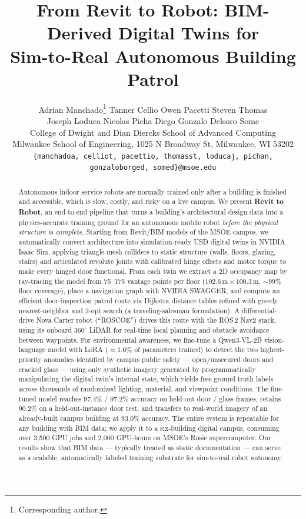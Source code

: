 \documentclass[10pt,twocolumn,letterpaper]{article}
\title{From Revit to Robot: BIM-Derived Digital Twins for\\
Sim-to-Real Autonomous Building Patrol}
\author{%
Adrian Manchado\thanks{Corresponding author.} \quad Tanner Cellio \quad Owen Pacetti \quad Steven Thomas\\
Joseph Loduca \quad Nicolas Picha \quad Diego Gonzalo \quad Delsoro Some\\
College of Dwight and Dian Diercks School of Advanced Computing\\
Milwaukee School of Engineering, 1025 N Broadway St, Milwaukee, WI 53202\\
{\tt\small \{manchadoa, celliot, pacettio, thomasst, loducaj, pichan, gonzaloborged, somed\}@msoe.edu}
}
\begin{document}
\maketitle

\begin{abstract}
Autonomous indoor service robots are normally trained only after a building is
finished and accessible, which is slow, costly, and risky on a live campus. We
present \textbf{Revit to Robot}, an end-to-end pipeline that turns a building's
architectural design data into a physics-accurate training ground for an
autonomous mobile robot \emph{before the physical structure is complete}.
Starting from Revit/BIM models of the MSOE campus, we automatically convert
architecture into simulation-ready USD digital twins in NVIDIA Isaac Sim,
applying triangle-mesh colliders to static structure (walls, floors, glazing,
stairs) and articulated revolute joints with calibrated hinge offsets and motor
torque to make every hinged door functional. From each twin we extract a 2D
occupancy map by ray-tracing the model from 75--175 vantage points per floor
($102.6\,\text{m}\times100.3\,\text{m}$, ${\sim}99\%$ floor coverage), place a
navigation graph with NVIDIA SWAGGER, and compute an efficient door-inspection patrol route
via Dijkstra distance tables refined with greedy nearest-neighbor and 2-opt
search (a traveling-salesman formulation). A differential-drive Nova Carter robot
(``ROSCOE'') drives this route with the ROS\,2 Nav2 stack, using its onboard
$360^\circ$ LiDAR for real-time local planning and obstacle avoidance between
waypoints. For environmental awareness, we fine-tune a Qwen3-VL-2B
vision-language model with LoRA ($\approx1.6\%$ of parameters trained) to detect
the two highest-priority anomalies identified by campus public safety ---
open/unsecured doors and cracked glass --- using only synthetic imagery generated
by programmatically manipulating the digital twin's internal state, which yields
free ground-truth labels across thousands of randomized lighting, material, and
viewpoint conditions. The fine-tuned model reaches $97.4\%$ / $97.2\%$ accuracy
on held-out door / glass frames, retains $90.2\%$ on a held-out-instance door
test, and transfers to real-world imagery of an already-built campus building at
$93.0\%$ accuracy. The entire system is repeatable for any building with BIM
data; we apply it to a six-building digital campus, consuming over 3{,}500 GPU
jobs and 2{,}000 GPU-hours on MSOE's Rosie supercomputer. Our results show that
BIM data --- typically treated as static documentation --- can serve as a
scalable, automatically labeled training substrate for sim-to-real robot
autonomy.
\end{abstract}
\end{document}
